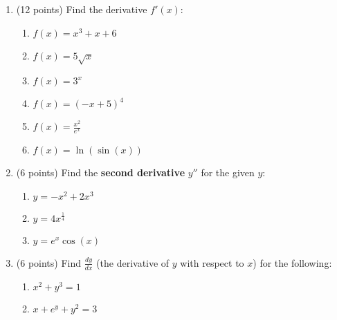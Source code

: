 \documentclass[11pt]{article}
\begin{document}
\begin{enumerate}[itemsep=30pt]
\begin{center}
\end{center}


\newpage


\item (12 points) Find the derivative $f'(x)$:
\begin{enumerate}[itemsep=40pt]
    \item{$f(x) = x^3 + x + 6$}
    \item{$f(x) = 5\sqrt{x}$}
    \item{$f(x) = 3^x$}
    \item{$f(x) = (-x + 5)^4$}
    \item{$f(x) = \displaystyle{\frac{x^2}{e^x}}$}
    \item{$f(x) = \ln(\sin(x))$}
\end{enumerate}

\vspace{20pt}
\item (6 points) Find the \textbf{second derivative} $y''$ for the given $y$:

\begin{enumerate}[itemsep=50pt]
    \item{$y = -x^2 + 2x^3$}
    \item{$y = 4x^{\frac{1}{4}}$}
    \item{$y = e^x \cos(x)$}
\end{enumerate}


\newpage


\item (6 points) Find $\frac{dy}{dx}$ (the derivative of $y$ with respect to $x$) for the following:
\begin{enumerate}[itemsep=70pt]
    \item $x^2 + y^3 = 1$
    \item $x + e^y + y^2 = 3$
\end{enumerate}


\end{enumerate}
\end{document}
